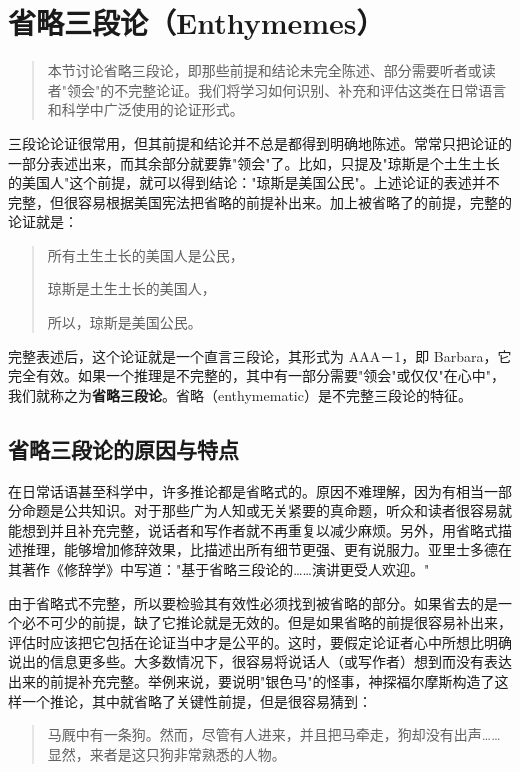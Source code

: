\section{省略三段论（Enthymemes）}

\begin{quotation}
本节讨论省略三段论，即那些前提和结论未完全陈述、部分需要听者或读者"领会"的不完整论证。我们将学习如何识别、补充和评估这类在日常语言和科学中广泛使用的论证形式。
\end{quotation}

三段论论证很常用，但其前提和结论并不总是都得到明确地陈述。常常只把论证的一部分表述出来，而其余部分就要靠"领会"了。比如，只提及"琼斯是个土生土长的美国人"这个前提，就可以得到结论："琼斯是美国公民"。上述论证的表述并不完整，但很容易根据美国宪法把省略的前提补出来。加上被省略了的前提，完整的论证就是：

\begin{quote}
所有土生土长的美国人是公民，

琼斯是土生土长的美国人，

所以，琼斯是美国公民。
\end{quote}

完整表述后，这个论证就是一个直言三段论，其形式为 AAA－1，即 Barbara，它完全有效。如果一个推理是不完整的，其中有一部分需要"领会"或仅仅"在心中"，我们就称之为\textbf{省略三段论}。省略（enthymematic）是不完整三段论的特征。

\subsection{省略三段论的原因与特点}

在日常话语甚至科学中，许多推论都是省略式的。原因不难理解，因为有相当一部分命题是公共知识。对于那些广为人知或无关紧要的真命题，听众和读者很容易就能想到并且补充完整，说话者和写作者就不再重复以减少麻烦。另外，用省略式描述推理，能够增加修辞效果，比描述出所有细节更强、更有说服力。亚里士多德在其著作《修辞学》中写道："基于省略三段论的……演讲更受人欢迎。"

由于省略式不完整，所以要检验其有效性必须找到被省略的部分。如果省去的是一个必不可少的前提，缺了它推论就是无效的。但是如果省略的前提很容易补出来，评估时应该把它包括在论证当中才是公平的。这时，要假定论证者心中所想比明确说出的信息更多些。大多数情况下，很容易将说话人（或写作者）想到而没有表达出来的前提补充完整。举例来说，要说明"银色马"的怪事，神探福尔摩斯构造了这样一个推论，其中就省略了关键性前提，但是很容易猜到：

\begin{quote}
马厩中有一条狗。然而，尽管有人进来，并且把马牵走，狗却没有出声……显然，来者是这只狗非常熟悉的人物。
\end{quote}

